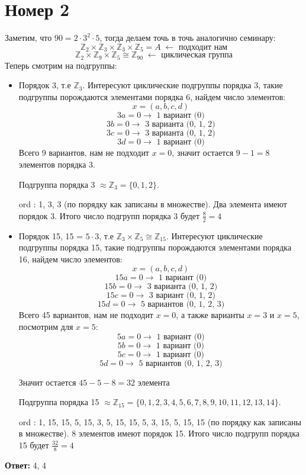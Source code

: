 \documentclass[a4paper,12pt, fleqn]{article}
\begin{document}
\section*{Номер 2}
Заметим, что $90 = 2 \cdot 3^2 \cdot 5$, тогда делаем точь в точь аналогично семинару:
\[
\mathbb{Z}_2 \times \mathbb{Z}_3 \times \mathbb{Z}_3 \times \mathbb{Z}_5 = A \; \leftarrow  \text{ подходит нам}
\]
\[
\mathbb{Z}_2 \times \mathbb{Z}_9 \times \mathbb{Z}_5 \cong \mathbb{Z}_{90} \; \leftarrow \text{ циклическая группа}  
\]
\[
\]
Теперь смотрим на подгруппы:
\begin{itemize}
\item Порядок $3$,  т.е $\mathbb{Z}_3$. Интересуют циклические подгруппы порядка 3, такие подгруппы порождаются элементами порядка 6, найдем число элементов:
\[
x = (a, b, c, d) 
\]
\[
3a = 0 \rightarrow \text{ 1 вариант (0)}
\]
\[
3b = 0 \rightarrow \text{ 3 варианта (0, 1, 2)}
\]
\[
3c= 0 \rightarrow \text{ 3 варианта (0, 1, 2)}
\]
\[
3d = 0 \rightarrow \text{ 1 вариант (0)}
\]
Всего 9 вариантов, нам не подходит $x = 0$, значит остается ${9 - 1 = 8}$ элементов порядка 3.

Подгруппа порядка 3 $ \approx\mathbb{Z}_3 = \{0, 1, 2\}$. 

ord : 1, 3, 3 (по порядку как записаны в множестве). Два элемента имеют порядок 3. Итого число подгрупп порядка 3 будет $\frac{8}{2} = 4$
\item  Порядок 15, 15 = $5 \cdot 3$, т.е $\mathbb{Z}_3 \times \mathbb{Z}_5 \cong \mathbb{Z}_{15}$. Интересуют циклические подгруппы порядка 15, такие подгруппы порождаются элементами порядка 16, найдем число элементов:
\[
x = (a, b, c, d) 
\]
\[
15a = 0 \rightarrow \text{ 1 вариант (0)}
\]
\[
15b = 0 \rightarrow \text{ 3 варианта (0, 1, 2)}
\]
\[
15c= 0 \rightarrow \text{ 3 вариант (0, 1, 2)}
\]
\[
15d = 0 \rightarrow \text{ 5 вариантов (0, 1, 2, 3)}
\]
Всего 45 вариантов, нам не подходит $x = 0$, а также варианты $x = 3$ и $x = 5$, посмотрим для $x = 5$: 
\[
5a = 0 \rightarrow \text{ 1 вариант (0)}
\]
\[
5b = 0 \rightarrow \text{ 1 вариант (0)}
\]
\[
5c = 0 \rightarrow \text{ 1 вариант (0)}
\]
\[
5d = 0 \rightarrow \text{ 5 вариантов (0, 1, 2, 3)}
\]

Значит остается $45 - 5 - 8  = 32$ элемента

Подгруппа порядка 15 $\approx \mathbb{Z}_{15} = \{0, 1, 2, 3, 4, 5, 6, 7, 8, 9, 10, 11, 12, 13, 14\}$.

ord : 1, 15, 15, 5, 15, 3, 5, 15, 15, 5, 3, 15, 5, 15, 15 (по порядку как записаны в множестве). 8 элементов имеют порядок 15. Итого число подгрупп порядка 15 будет $\frac{32}{8} = 4$
\end{itemize}
\begin{center}
\textbf{Ответ: } 4, 4
\end{center}
\clearpage
\end{document}
